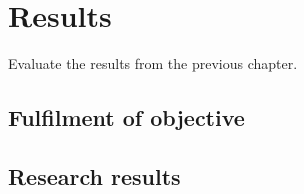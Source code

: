 \chapter{Results}\label{ch:results}

Evaluate the results from the previous chapter.

\section{Fulfilment of objective}\label{sec:results-fulfilment}


\section{Research results}\label{sec:results-research}
